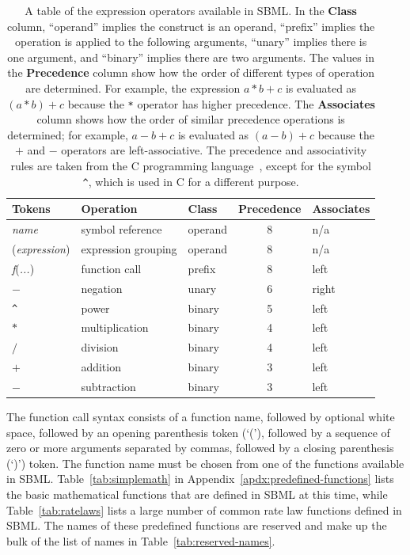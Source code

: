 \documentclass[10pt]{cekarticle}
\newcommand{\vref}[1]{\ref{#1}}
\begin{document}
\begin{table}[tbh]
  \vspace*{8pt}
  \begin{center}
    \begin{tabular}{lllcl}
      \toprule
      \textbf{Tokens} & \textbf{Operation} & \textbf{Class} & \textbf{Precedence} & \textbf{Associates} \\
      \midrule
      \emph{name} & symbol reference & operand & 8 & n/a \\
      (\emph{expression}) & expression grouping & operand & 8 & n/a\\
      \emph{f}(\emph{...}) & function call & prefix & 8 & left\\
      $-$ & negation & unary & 6 & right\\
      \verb|^| & power & binary & 5 & left \\
      $*$ & multiplication & binary & 4 & left\\
      $/$ & division & binary & 4 & left\\
      $+$ & addition & binary & 3 & left\\
      $-$ & subtraction & binary & 3 & left\\
      \bottomrule
    \end{tabular}
  \end{center}
  \caption{A table of the expression operators available in SBML.  In the
    \textbf{\textrm{Class}} column, ``operand'' implies the construct is an
    operand, ``prefix'' implies the operation is applied to the following
    arguments, ``unary'' implies there is one argument, and ``binary''
    implies there are two arguments.  The values in the
    \textbf{\textrm{Precedence}} column show how the order of different
    types of operation are determined.  For example, the expression $a * b
    + c$ is evaluated as $(a * b) + c$ because the \texttt{*} operator has
    higher precedence.  The \textbf{\textrm{Associates}} column shows how
    the order of similar precedence operations is determined; for example,
    $a - b + c$ is evaluated as $(a - b) + c$ because the $+$ and $-$
    operators are left-associative.  The precedence and associativity rules
    are taken from the C programming language~\protect\citep{harbison:1995},
    except for the symbol \texttt{\^}, which is used in C for a different
    purpose.}
  \label{tab:operators}
\end{table}

The function call syntax consists of a function name, followed by optional
white space, followed by an opening parenthesis token (`('), followed by a
sequence of zero or more arguments separated by commas, followed by a
closing parenthesis (`)') token.  The function name must be chosen from one
of the functions available in SBML.  Table~\ref{tab:simplemath} in
Appendix~\ref{apdx:predefined-functions} lists the basic mathematical
functions that are defined in SBML at this time, while
Table~\ref{tab:ratelaws} lists a large number of common rate law functions
defined in SBML.  The names of these predefined functions are reserved and
make up the bulk of the list of names in
Table~\vref{tab:reserved-names}.
\end{document}
